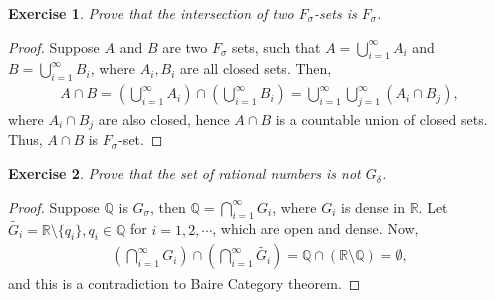\documentclass[11pt]{book}
\newtheorem{exercise}{Exercise}[section]
\theoremstyle{definition}
\numberwithin{equation}{chapter}
\begin{document}
\medskip

\begin{exercise}
Prove that the intersection of two $F_\sigma$-sets is $F_\sigma$.
\end{exercise}
\begin{proof}
Suppose $A$ and $B$ are two $F_\sigma$ sets, such that $A = \bigcup^\infty_{i=1} A_i$ and $B = \bigcup^\infty_{i=1} B_i$, where $A_i, B_i$ are all closed sets. Then,
\begin{align*}
    A \cap B = \left(\bigcup^\infty_{i=1} A_i\right) \cap \left(\bigcup^\infty_{i=1} B_i\right) = \bigcup^\infty_{i=1} \bigcup^\infty_{j=1} (A_i \cap B_j),
\end{align*}
where $A_i \cap B_j$ are also closed, hence $A \cap B$ is a countable union of closed sets. Thus, $A \cap B$ is $F_\sigma$-set.
\end{proof}

\medskip

\begin{exercise}
Prove that the set of rational numbers is not $G_\delta$.
\end{exercise}
\begin{proof}
Suppose $\mathbb{Q}$ is $G_\sigma$, then $\mathbb{Q} = \bigcap^\infty_{i=1} G_i$, where $G_i$ is dense in $\mathbb{R}$. Let $\widetilde{G_i} = \mathbb{R} \setminus \{q_i\}, q_i \in \mathbb{Q}$ for $i = 1,2,\cdots$, which are open and dense. Now,
\begin{align*}
    \left(\bigcap^\infty_{i=1}G_i\right) \cap \left(\bigcap^\infty_{i=1}\widetilde{G_i}\right) = \mathbb{Q} \cap (\mathbb{R} \setminus \mathbb{Q}) = \emptyset,
\end{align*}
and this is a contradiction to Baire Category theorem.
\end{proof}

\medskip
\end{document}
